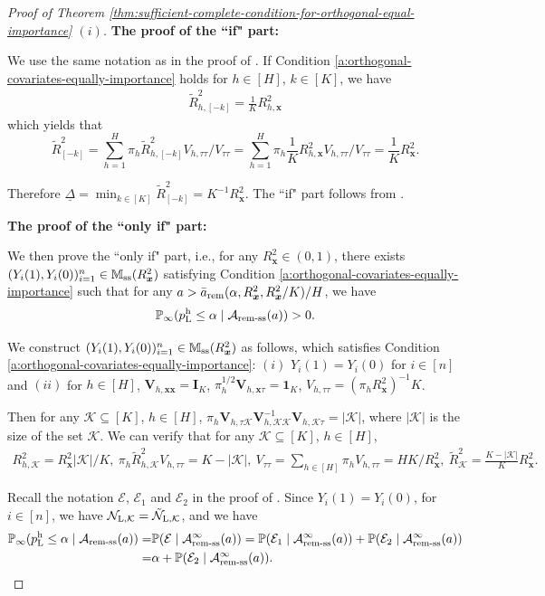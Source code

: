 \documentclass[12pt]{article}
\newcommand{\sss}{\textnormal{ss}}
\newcommand{\Lin}{\textnormal{L}}
\newcommand{\Prob}{\mathbb{P}}
\newcommand{\mk}{\mathcal{K}}
\newcommand{\ma}{\mathcal{A}}
\newcommand{\rem}{\textnormal{rem}}
\newcommand{\remss}{\textnormal{rem-ss}}
\newcommand{\bs}{\boldsymbol}
\newcommand{\hpL}{p_\textnormal{L}^{\textnormal{h}}}
\begin{document}
\begin{proof}[Proof of Theorem \ref{thm:sufficient-complete-condition-for-orthogonal-equal-importance} $(i)$]
\noindent\textbf{The proof of the ``if" part:}

We use the same notation as in the proof of . If Condition \ref{a:orthogonal-covariates-equally-importance} holds for $h\in [H]$, $k\in[K]$, we have
\begin{align*}
    \tilde{R}^2_{ h, [-k]} = \frac{1}{K} R^2_{h,\bs{x}}
\end{align*}
which yields that
\[
 \tilde{R}^2_{[-k]} =  \sum_{h=1}^H \pi_{ h } \tilde{R}^2_{ h, [-k]} V_{ h,\tau\tau}/V_{\tau\tau} =  \sum_{h=1}^H \pi_{ h } \frac{1}{K} R^2_{h,\bs{x}} V_{ h,\tau\tau}/V_{\tau\tau} = \frac{1}{K} R_{\bs{x}}^2.
\]

Therefore $\underline{\Delta} = \min_{k\in [K]}\tilde{R}^2_{[-k]} = K^{-1}R_{\bs{x}}^2$. The ``if" part follows from .

\noindent\textbf{The proof of the ``only if" part:}

We then prove the ``only if" part, i.e., for any $R^2_{\bs{x}} \in (0,1)$, there exists $(Y_i(1),Y_i(0))_{i=1}^n \in \mathbb{M}_{\sss}(R^2_{\bs{x}})$ satisfying Condition \ref{a:orthogonal-covariates-equally-importance} such that for any $a > \bar{a}_{\rem}(\alpha, R^2_{\bs{x}}, R^2_{\bs{x}}/K)/H$, we have
\[
\Prob_{\infty}(\hpL \leq \alpha \mid \ma_{\remss}(a)) > 0.
\]

We construct $(Y_i(1),Y_i(0))_{i=1}^n \in \mathbb{M}_{\sss}(R^2_{\bs{x}})$ as follows, which  satisfies Condition \ref{a:orthogonal-covariates-equally-importance}:  $(i)$ $Y_i(1)=Y_i(0) $ for $i\in [n]$ and $(ii)$  for $h \in [H]$, $\bs{V}_{h, \bs{x}\bs{x}} = \bs{I}_{K}$, $\pi_{h}^{1/2}\bs{V}_{h, \bs{x}\tau}  = \bs{1}_{K}$, $V_{h,\tau\tau} = (\pi_{h}R^2_{\bs{x}})^{-1}K$. 

Then for any $\mk \subseteq [K]$, $h\in [H]$, $\pi_h \bs{V}_{h,\tau\mk} \bs{V}_{h,\mk\mk}^{-1}\bs{V}_{h,\mk \tau} = |\mk|$, where $|\mk|$ is the size of the set $\mk$.  We can verify that for any $\mk \subseteq [K]$, $h\in [H]$,
\begin{align}
\label{eq:eq1}
R^2_{ h, \mk} = R^2_{\bs{x}}|\mk|/K,~ \pi_h\tilde{R}^2_{ h, \mk}V_{ h,\tau\tau} = K - |\mk|,~  V_{\tau\tau} = \sum_{h\in [H]}\pi_h V_{h,\tau\tau} = HK/R^2_{\bs{x}},~ \tilde{R}^2_{\mk} = \frac{K-|\mk|}{K}R^2_{\bs{x}}.
\end{align}


Recall the notation $\mathcal{E}$, $\mathcal{E}_1$ and $\mathcal{E}_2$ in the proof of . Since $Y_i(1)=Y_i(0) $, for $i\in [n]$, we have $\mathcal{N}_{\Lin,\mk} = \tilde{\mathcal{N}}_{\Lin,\mk}$, and we have
\begin{align*}
\Prob_{\infty}(\hpL \leq \alpha \mid \mathcal{A}_{\remss}(a)) =& \Prob(\mathcal{E}\mid\mathcal{A}_{\remss}^{\infty}(a)) = \Prob(\mathcal{E}_1\mid\mathcal{A}_{\remss}^{\infty}(a))+\Prob(\mathcal{E}_2\mid\mathcal{A}_{\remss}^{\infty}(a))\\
=& \alpha + \Prob(\mathcal{E}_2\mid\mathcal{A}_{\remss}^{\infty}(a)).
\end{align*}


\end{proof}
\end{document}
